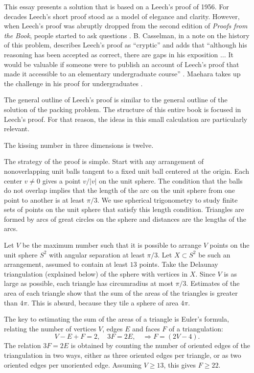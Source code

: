 This essay presents a solution that is based on a Leech's proof
of 1956.  For decades Leech's short proof stood as a model of elegance and clarity.
However,  when Leech's proof was abruptly dropped from the second
edition of {\it Proofs from the Book}, people started to ask questions \cite{AZ98}.  
B. Casselman, in a note on
the history of this problem, describes Leech's proof as ``cryptic'' and adds 
that ``although his reasoning has been accepted as correct, there are gaps in his
exposition $\ldots$  It would be valuable if someone were to publish an account
of Leech's proof that made it accessible to an elementary undergraduate course'' \cite{BC04}.
Maehara takes up the challenge in his proof for undergraduates \cite{Mae07}.

The general outline of Leech's proof is similar to the general outline of the solution
of the packing problem.  The structure of this entire book is focused in Leech's proof.
  For that reason, the ideas in this small calculation
are particularly relevant. 

\begin{theorem} The kissing number in three dimensions is twelve.
\end{theorem}

The strategy of the proof is simple.    
Start with any arrangement
of nonoverlapping 
unit balls tangent to a fixed unit ball centered at the origin.  Each
center $v\ne0$ gives a point $v/|v|$ on the unit sphere.  The condition
that the balls do not overlap implies that the length of the arc on the
unit sphere from one point to another is at least $\pi/3$.  
We use spherical trigonometry to study finite sets of points on the unit sphere that satisfy this length condition.
Triangles are formed by arcs of great circles on the sphere and distances are
the lengths of the arcs.

Let $V$ be the maximum
number such that it is possible to arrange $V$ points on the unit
sphere $S^2$ with angular separation at least $\pi/3$.  Let $X\subset S^2$ be
such an arrangement, assumed to contain at least $13$ points. 
Take the Delaunay triangulation (explained below) 
of the sphere with vertices in $X$. Since  $V$ is as large as
possible, each triangle has circumradius at most $\pi/3$.  Estimates
of the area of each triangle show that the sum of the areas of the triangles is
greater than $4\pi$.  This is absurd, because they tile a sphere
of area $4\pi$.

The key to estimating the sum of the areas of a triangle is Euler's formula,
relating the number of vertices $V$, edges $E$ and faces $F$ of
a triangulation:
    $$V - E + F = 2,\quad 3 F = 2 E,\quad \Rightarrow F =
    (2V-4).$$
The relation $3 F = 2 E$ is obtained by counting the number of oriented edges of the
triangulation in two ways, either as three oriented edges per triangle, or as two oriented edges per 
unoriented edge.
Assuming $V\ge 13$, this gives $F\ge 22$. 

